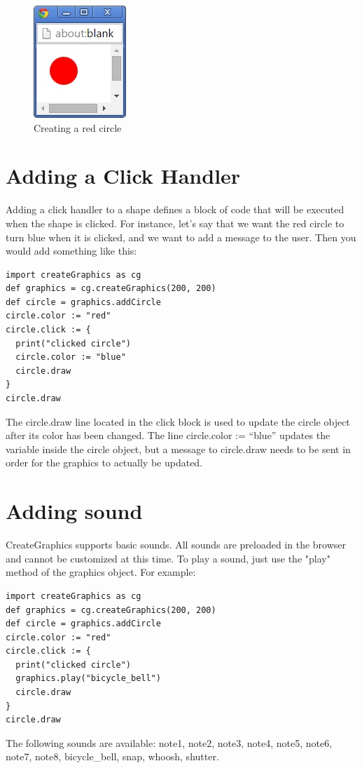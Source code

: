 \documentclass{article}
\begin{document}
\begin{figure}[h]
\includegraphics{red_circle}
\centering
\caption{Creating a red circle}
\label{fig:red_circle}
\end{figure}

\section{Adding a Click Handler}
Adding a click handler to a shape defines a block of code that will be executed when the shape is clicked. For instance,
let's say that we want the red circle to turn blue when it is clicked, and we want to add a message to the user. 
Then you would add something like this:
\begin{lstlisting}
import createGraphics as cg
def graphics = cg.createGraphics(200, 200)
def circle = graphics.addCircle
circle.color := "red"
circle.click := { 
  print("clicked circle") 
  circle.color := "blue"
  circle.draw
}
circle.draw
\end{lstlisting}
The \color{blue} circle.draw \color{black} line located in the click block is used to update the circle object after its color
has been changed. The line \color{blue}circle.color := ``blue'' \color{black} updates the variable inside the circle object, but
a message to circle.draw needs to be sent in order for the graphics to actually be updated.

\section{Adding sound}
CreateGraphics supports basic sounds. All sounds are preloaded in the browser and cannot be customized at this time.
To play a sound, just use the "play" method of the graphics object. For example:
\begin{lstlisting}
import createGraphics as cg
def graphics = cg.createGraphics(200, 200)
def circle = graphics.addCircle
circle.color := "red"
circle.click := { 
  print("clicked circle") 
  graphics.play("bicycle_bell")
  circle.draw
}
circle.draw
\end{lstlisting}


The following sounds are available: note1, note2, note3, note4, note5, note6, note7, note8, bicycle\_bell, snap, 
whoosh, shutter.
\end{document}
